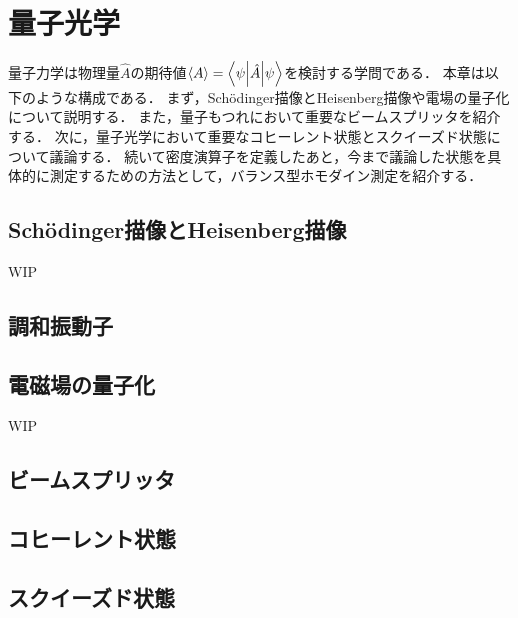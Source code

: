 \documentclass{report}
\begin{document}
  \maketitle
  \tableofcontents
  \chapter{量子光学}
    量子力学は物理量$\hat{A}$の期待値$\ev{A} = \mel**{\psi}{\hat{A}}{\psi}$を検討する学問である．
    本章は以下のような構成である．
    まず，Sch\"odinger描像とHeisenberg描像や電場の量子化について説明する．
    また，量子もつれにおいて重要なビームスプリッタを紹介する．
    次に，量子光学において重要なコヒーレント状態とスクイーズド状態について議論する．
    続いて密度演算子を定義したあと，今まで議論した状態を具体的に測定するための方法として，バランス型ホモダイン測定を紹介する．
    \section{Sch\"odinger描像とHeisenberg描像}
      WIP
    \section{調和振動子}
      
    \section{電磁場の量子化}
      WIP
    \section{ビームスプリッタ}
      
    \section{コヒーレント状態}
      
    \section{スクイーズド状態}
      
\end{document}

